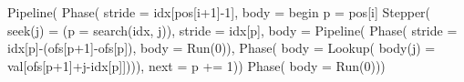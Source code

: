 \begin{juliacode}
Pipeline(
  Phase(
    stride = idx[pos[i+1]-1],
    body = begin
      p = pos[i]
      Stepper(
        seek(j) = (p = search(idx, j)),
        stride = idx[p],
        body = Pipeline(
          Phase(
            stride = idx[p]-(ofs[p+1]-ofs[p]),
            body = Run(0)),
          Phase(
            body = Lookup(
              body(j) =
                val[ofs[p+1]+j-idx[p]]))),
        next = p += 1))
  Phase(
    body = Run(0)))
\end{juliacode}